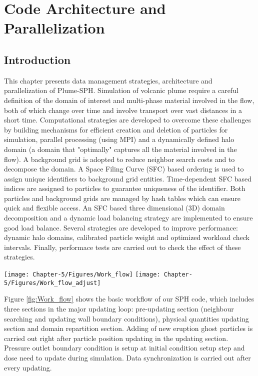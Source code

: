 \chapter{Code Architecture and Parallelization} \label{chapter:architecture-parallelism}

\section{Introduction}
\label{sect:introduction}
This chapter presents data management strategies, architecture and parallelization of Plume-SPH.
Simulation of volcanic plume require a careful definition of the domain of interest and multi-phase material involved in the flow, both of which change over time and involve transport over vast distances in a short time.
Computational strategies are developed to overcome these challenges by building mechanisms for efficient creation and deletion of particles for simulation, parallel processing (using MPI) and a dynamically defined halo domain (a domain that "optimally" captures all the material involved in the flow).
A background grid is adopted to reduce neighbor search costs and to decompose the domain. A Space Filing Curve (SFC) based ordering is
 used to assign unique identifiers to background grid entities. Time-dependent SFC based indices are assigned to particles to guarantee uniqueness of the identifier. Both particles and background grids are managed by hash tables which can ensure quick and flexible access. An SFC based three dimensional (3D) domain decomposition and a dynamic load balancing strategy are implemented to ensure good load balance. Several strategies are developed to improve performance: dynamic halo domains, calibrated particle weight and optimized workload check intervals. 
Finally, performace tests are carried out to check the effect of these strategies.

\begin{figure*}
\centering
\texttt{[image: Chapter-5/Figures/Work\_flow]}
\hfil
\texttt{[image: Chapter-5/Figures/Work\_flow\_adjust]}
\caption{Workflow for SPH code. Figure to the left is the basic workflow. The right figure is the workflow that enables dynamic halo domain. These steps in orange box are newly added steps. Extra computational costs associated with these extra steps are shown to be neglectable in section \ref{sec:effect-of-halo-domain}}
\label{fig:Work_flow}
\end{figure*}

Figure \ref{fig:Work_flow} shows the basic workflow of our SPH code, which includes three sections in the major updating loop: pre-updating section (neighbour searching and updating wall boundary conditions), physical quantities updating section and domain repartition section. Adding of new eruption ghost particles is carried out right after particle position updating in the updating section. Pressure outlet boundary condition is setup at initial condition setup step and dose need to update during simulation. Data synchronization is carried out after every updating.


